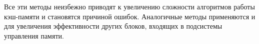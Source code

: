 Все эти методы неизбежно приводят к увеличению сложности алгоритмов работы кэш-памяти и становятся причиной ошибок. Аналогичные методы применяются и для увеличения эффективности других блоков, входящих в подсистемы управления памяти.





%

